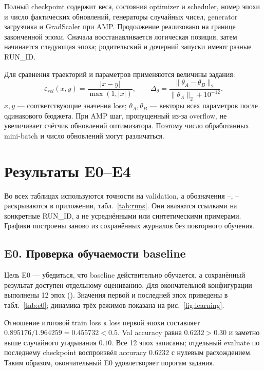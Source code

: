 Полный checkpoint содержит веса, состояния optimizer и scheduler, номер эпохи и число фактических обновлений, генераторы случайных чисел, generator загрузчика и GradScaler при AMP. Продолжение реализовано на границе законченной эпохи. Сначала восстанавливается логическая позиция, затем начинается следующая эпоха; родительский и дочерний запуски имеют разные RUN\_ID.

Для сравнения траекторий и параметров применяются величины задания:
\begin{equation}
\varepsilon_{rel}(x,y)=\frac{|x-y|}{\max(1,|x|)},\qquad
\Delta_\theta=\frac{\|\theta_A-\theta_B\|_2}{\|\theta_A\|_2+10^{-12}}.
\label{eq:distances}
\end{equation}
$x,y$ --- соответствующие значения loss; $\theta_A,\theta_B$ --- векторы всех параметров после одинакового бюджета. При AMP шаг, пропущенный из-за overflow, не увеличивает счётчик обновлений оптимизатора. Поэтому число обработанных mini-batch и число обновлений могут различаться.

\section{Результаты E0--E4}
Во всех таблицах используются точности на validation, а обозначения --, -- раскрываются в приложении, табл.~\ref{tab:runs}. Они являются ссылками на конкретные RUN\_ID, а не усреднёнными или синтетическими примерами. Графики построены заново из сохранённых журналов без повторного обучения.

\subsection{E0. Проверка обучаемости baseline}\label{sec:e0}
Цель E0 --- убедиться, что baseline действительно обучается, а сохранённый результат доступен отдельному оцениванию. Для окончательной конфигурации выполнены 12 эпох (). Значения первой и последней эпох приведены в табл.~\ref{tab:e0}; динамика трёх режимов показана на рис.~\ref{fig:learning}.

\begin{table}[H]\centering\small
\caption{Первый и последний этапы обучения E0 ().}\label{tab:e0}

\end{table}

Отношение итоговой train loss к loss первой эпохи составляет $0.895176/1.964259=0.455732<0.5$. Val accuracy равна $0.6232>0.30$ и заметно выше случайного угадывания $0.10$. Все 12 эпох записаны; отдельный evaluate по последнему checkpoint воспроизвёл accuracy $0.6232$ с нулевым расхождением. Таким образом, окончательный E0 удовлетворяет порогам задания.

